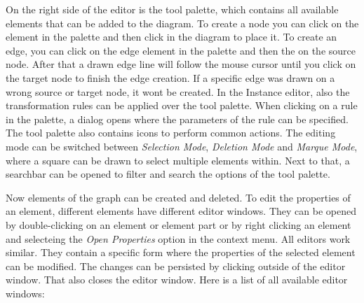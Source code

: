 On the right side of the editor is the tool palette, which contains all available elements that can be added to the diagram. To create a node you can click on the element in the palette and then click in the diagram to place it. To create an edge, you can click on the edge element in the palette and then the on the source node. After that a drawn edge line will follow the mouse cursor until you click on the target node to finish the edge creation. If a specific edge was drawn on a wrong source or target node, it wont be created. In the Instance editor, also the transformation rules can be applied over the tool palette. When clicking on a rule in the palette, a dialog opens where the parameters of the rule can be specified. The tool palette also contains icons to perform common actions. The editing mode can be switched between \textit{Selection Mode}, \textit{Deletion Mode} and \textit{Marque Mode}, where a square can be drawn to select multiple elements within. Next to that, a searchbar can be opened to filter and search the options of the tool palette.

Now elements of the graph can be created and deleted. To edit the properties of an element, different elements have different editor windows. They can be opened by double-clicking on an element or element part or by right clicking an element and selecteing the \textit{Open Properties} option in the context menu. All editors work similar. They contain a specific form where the properties of the selected element can be modified. The changes can be persisted by clicking outside of the editor window. That also closes the editor window. Here is a list of all available editor windows:

